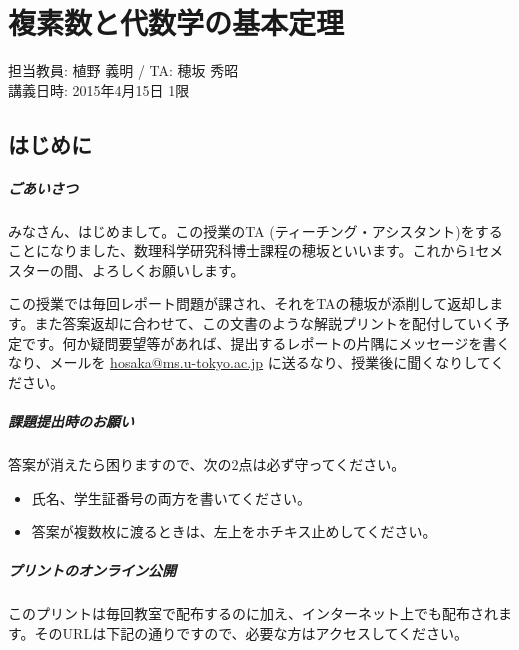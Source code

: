 \chapter{複素数と代数学の基本定理}

\begin{flushright}
担当教員: 植野 義明 / TA: 穂坂 秀昭 \\
講義日時: 2015年4月15日 1限
\end{flushright}

\section{はじめに}

\paragraph{ごあいさつ}

みなさん、はじめまして。この授業のTA (ティーチング・アシスタント)をすることになりました、数理科学研究科博士課程の穂坂といいます。これから$1$セメスターの間、よろしくお願いします。

この授業では毎回レポート問題が課され、それをTAの穂坂が添削して返却します。また答案返却に合わせて、この文書のような解説プリントを配付していく予定です。何か疑問要望等があれば、提出するレポートの片隅にメッセージを書くなり、メールを \url{hosaka@ms.u-tokyo.ac.jp} に送るなり、授業後に聞くなりしてください。

\paragraph{課題提出時のお願い}
答案が消えたら困りますので、次の$2$点は必ず守ってください。\vspace{-0.5zw}
\begin{itemize}
\item 氏名、学生証番号の両方を書いてください。
\item 答案が複数枚に渡るときは、左上をホチキス止めしてください。
\end{itemize}

\vspace{-1zw}
\paragraph{プリントのオンライン公開}

このプリントは毎回教室で配布するのに加え、インターネット上でも配布されます。そのURLは下記の通りですので、必要な方はアクセスしてください。

